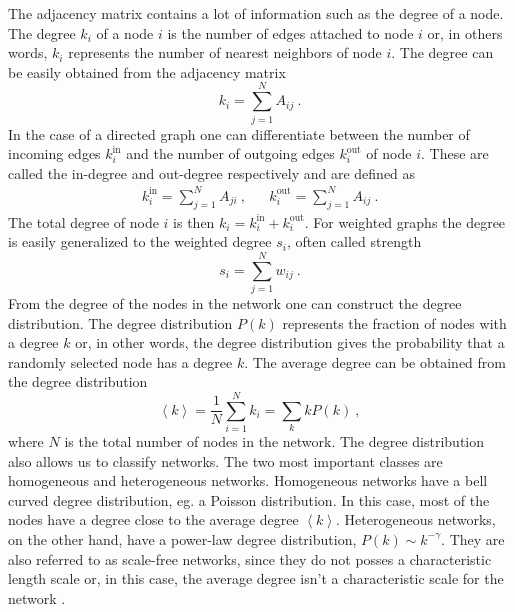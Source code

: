 \documentclass[11 pt , letterpaper , twoside , openright]{book}
\begin{document}
The adjacency matrix contains a lot of information such as the degree of a node. The degree $k_i$ of a node $i$ is the number of edges attached to node $i$ or, in others words, $k_i$ represents the number of nearest neighbors of node $i$. The degree can be easily obtained from the adjacency matrix \cite{Mata2020}
\begin{equation}
	k_i = \sum_{j=1}^N A_{ij}\ .
\end{equation}
In the case of a directed graph one can differentiate between the number of incoming edges $k_i^{\textrm{in}}$ and the number of outgoing edges $k_i^{\textrm{out}}$ of node $i$. These are called the in-degree and out-degree respectively and are defined as \cite{Mata2020}
\begin{align}
	k_i^{\text{in}} = \sum_{j=1}^N A_{ji} \ , && k_i^{\text{out}} = \sum_{j=1}^N A_{ij} \ .
\end{align}
The total degree of node $i$ is then $k_i = k_i^{\text{in}} + k_i^{\text{out}}$. For weighted graphs the degree is easily generalized to the weighted degree $s_i$, often called strength \cite{Ioannis2007}
\begin{equation}
	s_i = \sum_{j=1}^N w_{ij} \ .
\end{equation}
From the degree of the nodes in the network one can construct the degree distribution. The degree distribution $P(k)$ represents the fraction of nodes with a degree $k$ or, in other words, the degree distribution gives the probability that a randomly selected node has a degree $k$. The average degree can be obtained from the degree distribution \cite{Mata2020}
\begin{equation}
	\left<k\right> = \frac{1}{N} \sum_{i=1}^N k_i = \sum_k k P(k) \ ,
\end{equation}
where $N$ is the total number of nodes in the network. The degree distribution also allows us to classify networks. The two most important classes are homogeneous and heterogeneous networks. Homogeneous networks have a bell curved degree distribution, eg. a Poisson distribution. In this case, most of the nodes have a degree close to the average degree $\left<k\right>$. Heterogeneous networks, on the other hand, have a power-law degree distribution, $P(k) \sim k^{-\gamma}$. %
They are also referred to as scale-free networks, since they do not posses a characteristic length scale or, in this case, the average degree isn't a characteristic scale for the network \cite{Mata2020}. %
\end{document}
